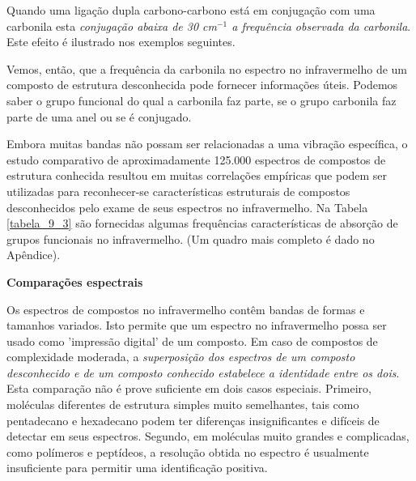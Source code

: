 Quando uma ligação dupla carbono-carbono está em conjugação com uma carbonila esta \textit{conjugação abaixa de 30 cm$^{-1}$ a frequência observada da carbonila}. Este efeito é ilustrado nos exemplos seguintes.

\begin{figure}[H]
    \centering
    \chemnameinit{}
    \qquad
    \chemnameinit{}
    \qquad
    \chemnameinit{}
    \qquad
    \chemnameinit{}
\end{figure}

Vemos, então, que a frequência da carbonila no espectro no infravermelho de um composto de estrutura desconhecida pode fornecer informações úteis. Podemos saber o grupo funcional do qual a carbonila faz parte, se o grupo carbonila faz parte de uma anel ou se é conjugado.

Embora muitas bandas não possam ser relacionadas a uma vibração específica, o estudo comparativo de aproximadamente 125.000 espectros de compostos de estrutura conhecida resultou em muitas correlações empíricas que podem ser utilizadas para reconhecer-se características estruturais de compostos desconhecidos pelo exame de seus espectros no infravermelho. Na Tabela \ref{tabela_9_3} são fornecidas algumas frequências características de absorção de grupos funcionais no infravermelho. (Um quadro mais completo é dado no Apêndice).

\noindent \textbf{Comparações espectrais}

\noindent Os espectros de compostos no infravermelho contêm bandas de formas e tamanhos variados. Isto permite que um espectro no infravermelho possa ser usado como 'impressão digital' de um composto. Em caso de compostos de complexidade moderada, a \textit{superposição dos espectros de um composto desconhecido e de um composto conhecido estabelece a identidade entre os dois}. Esta comparação não é prove suficiente em dois casos especiais. Primeiro, moléculas diferentes de estrutura simples muito semelhantes, tais como pentadecano e hexadecano podem ter diferenças insignificantes e difíceis de detectar em seus espectros. Segundo, em moléculas muito grandes e complicadas, como polímeros e peptídeos, a resolução obtida no espectro é usualmente insuficiente para permitir uma identificação positiva.

